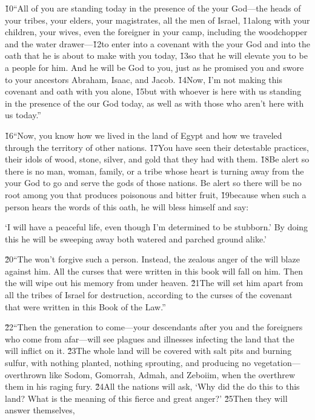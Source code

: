 \v{10}``All of you are standing today in the presence of the  your God---the heads of your tribes, your elders, your magistrates, all the men of Israel, \v{11}along with your children, your wives, even the foreigner in your camp, including the woodchopper and the water drawer---\v{12}to enter into a covenant with the  your God and into the oath that he is about to make with you today, \v{13}so that he will elevate you to be a people for him. And he will be God to you, just as he promised you and swore to your ancestors Abraham, Isaac, and Jacob. \v{14}Now, I'm not making this covenant and oath with you alone, \v{15}but with whoever is here with us standing in the presence of the  our God today, as well as with those who aren't here with us today.''

\v{16}``Now, you know how we lived in the land of Egypt and how we traveled through the territory of other nations. \v{17}You have seen their detestable practices, their idols of wood, stone, silver, and gold that they had with them. \v{18}Be alert so there is no man, woman, family, or a tribe whose heart is turning away from the  your God to go and serve the gods of those nations. Be alert so there will be no root among you that produces poisonous and bitter fruit, \v{19}because when such a person hears the words of this oath, he will bless himself and say:

\begin{poetry}
\poeml `I will have a peaceful life, even though I'm determined to be stubborn.' By doing this he will be sweeping away both watered and parched ground alike.'
\end{poetry}

\v{20}``The  won't forgive such a person. Instead, the zealous anger of the  will blaze against him. All the curses that were written in this book will fall on him. Then the  will wipe out his memory from under heaven. \v{21}The  will set him apart from all the tribes of Israel for destruction, according to the curses of the covenant that were written in this Book of the Law.''

\v{22}``Then the generation to come---your descendants after you and the foreigners who come from afar---will see plagues and illnesses infecting the land that the  will inflict on it. \v{23}The whole land will be covered with salt pits and burning sulfur, with nothing planted, nothing sprouting, and producing no vegetation---overthrown like Sodom, Gomorrah, Admah, and Zeboiim, when the  overthrew them in his raging fury. \v{24}All the nations will ask, `Why did the  do this to this land? What is the meaning of this fierce and great anger?' \v{25}Then they will answer themselves,

